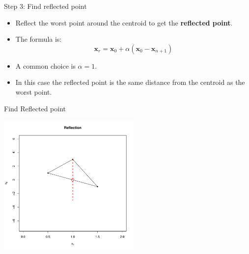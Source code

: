 \documentclass[10pt]{beamer}
\begin{document}
\begin{frame}{Step 3: Find reflected point}
  \begin{itemize}
  \item Reflect the worst point around the centroid to get the {\bf reflected point}.

  \item The formula is:
    \begin{equation}
      {\bm x_r}={\bm x_0}+\alpha({\bm x_0}-{\bm x_{n+1}})
    \end{equation}

  \item A common choice is $\alpha=1$.

  \item In this case the reflected point is the same distance from the centroid as the worst point.
  \end{itemize}
\end{frame}
\begin{frame}{Find Reflected point}
  \begin{center}
    \includegraphics[height=7cm]{RCode/nmrefl.pdf}
  \end{center}
\end{frame}
\end{document}

